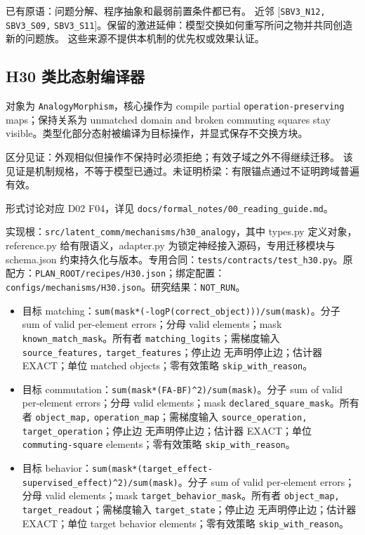 \documentclass[
  10pt,
]{article}
\begin{document}
已有原语：问题分解、程序抽象和最弱前置条件都已有。 近邻
{[}\nolinkurl{SBV3_N12,} \nolinkurl{SBV3_S09,}
\nolinkurl{SBV3_S11}{]}。保留的激进延伸：模型交换如何重写所问之物并共同创造新的问题族。
这些来源不提供本机制的优先权或效果认证。

\subsection{H30
类比态射编译器}\label{h30-ux7c7bux6bd4ux6001ux5c04ux7f16ux8bd1ux5668}

对象为 \nolinkurl{AnalogyMorphism}，核心操作为 compile partial
\nolinkurl{operation-preserving} maps；保持关系为 unmatched domain and
broken commuting squares stay
visible。类型化部分态射被编译为目标操作，并显式保存不交换方块。

区分见证：外观相似但操作不保持时必须拒绝；有效子域之外不得继续迁移。
该见证是机制规格，不等于模型已通过。未证明桥梁：有限锚点通过不证明跨域普遍有效。

形式讨论对应 D02 F04，详见
{\small\nolinkurl{docs/formal_notes/00_reading_guide.md}}。

实现根：{\small\nolinkurl{src/latent_comm/mechanisms/h30_analogy}}，其中
types.py 定义对象，reference.py 给有限语义，adapter.py
为锁定神经接入源码，专用迁移模块与 schema.json
约束持久化与版本。专用合同：{\small\nolinkurl{tests/contracts/test_h30.py}}。原配方：{\small\nolinkurl{PLAN_ROOT/recipes/H30.json}}；绑定配置：{\small\nolinkurl{configs/mechanisms/H30.json}}。研究结果：\nolinkurl{NOT_RUN}。

\begin{itemize}
\item
  目标
  matching：{\small\nolinkurl{sum(mask*(-log}\hspace{0.333em}\nolinkurl{P(correct_object)))/sum(mask)}}。分子
  sum of valid per-element errors；分母 valid elements；mask
  \nolinkurl{known_match_mask}。所有者
  \nolinkurl{matching_logits}；需梯度输入 \nolinkurl{source_features,}
  \nolinkurl{target_features}；停止边 无声明停止边；估计器 EXACT；单位
  matched objects；零有效策略 \nolinkurl{skip_with_reason}。
\item
  目标
  commutation：{\small\nolinkurl{sum(mask*(F}\hspace{0.333em}\nolinkurl{A-B}\hspace{0.333em}\nolinkurl{F)^2)/sum(mask)}}。分子
  sum of valid per-element errors；分母 valid elements；mask
  \nolinkurl{declared_square_mask}。所有者 \nolinkurl{object_map,}
  \nolinkurl{operation_map}；需梯度输入 \nolinkurl{source_operation,}
  \nolinkurl{target_operation}；停止边 无声明停止边；估计器 EXACT；单位
  \nolinkurl{commuting-square} elements；零有效策略
  \nolinkurl{skip_with_reason}。
\item
  目标
  behavior：{\small\nolinkurl{sum(mask*(target_effect-supervised_effect)^2)/sum(mask)}}。分子
  sum of valid per-element errors；分母 valid elements；mask
  \nolinkurl{target_behavior_mask}。所有者 \nolinkurl{object_map,}
  \nolinkurl{target_readout}；需梯度输入
  \nolinkurl{target_state}；停止边 无声明停止边；估计器 EXACT；单位
  target behavior elements；零有效策略 \nolinkurl{skip_with_reason}。
\end{itemize}
\end{document}
